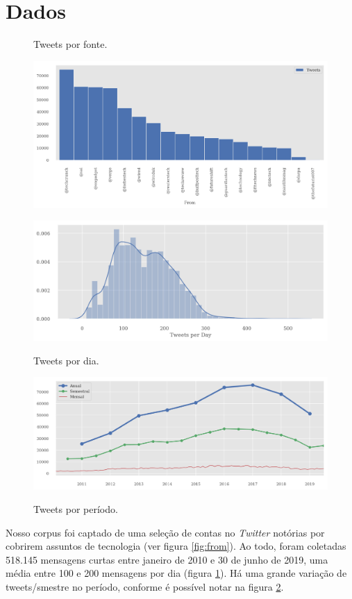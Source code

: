 \documentclass[paper=a4, fontsize=11pt]{scrartcl}
\numberwithin{equation}{section}		%
\numberwithin{figure}{section}			%
\numberwithin{table}{section}				%
\begin{document}
\section{Dados}\label{sec:dados}
\begin{figure}[!h]
  \centering
  \begin{minipage}[t]{0.4\textwidth}
		\caption{Tweets por fonte.}
		\includegraphics[width=\textwidth]{from}
		\label{fig:from}
  \end{minipage}
  \hfill
  \begin{minipage}[t]{0.4\textwidth}
		\caption{Tweets por dia.}
		\includegraphics[width=\textwidth]{perDay}
		\label{fig:daily}
  \end{minipage}
\end{figure}
\begin{figure}[!h]
	\centering
	\caption{Tweets por período.}
	\includegraphics[width=.8\columnwidth]{anual-semestral}
	\label{fig:volume-tweets}
\end{figure}
Nosso corpus foi captado de uma seleção de contas no \emph{Twitter} notórias por cobrirem assuntos de tecnologia (ver figura \ref{fig:from}). Ao todo, foram coletadas 518.145 mensagens curtas entre janeiro de 2010 e 30 de junho de 2019, uma média entre 100 e 200 mensagens por dia (figura \ref{fig:daily}).
Há uma grande variação de tweets/smestre no período, conforme é possível notar na figura \ref{fig:volume-tweets}.
\end{document}
